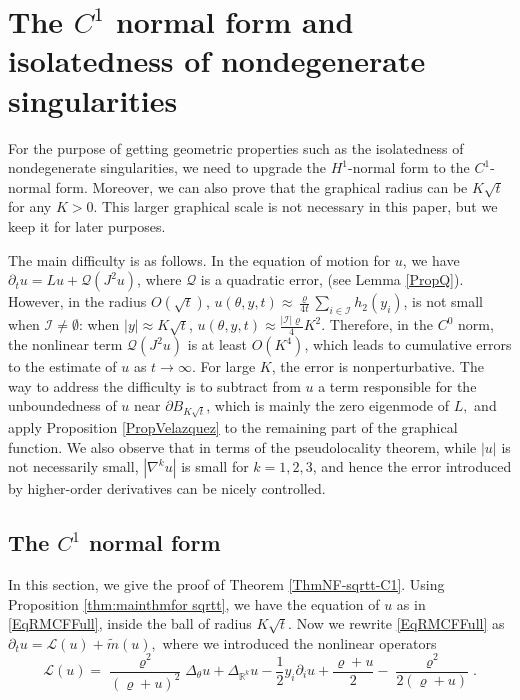\documentclass[11pt]{amsart}
\numberwithin{equation}{section}
\numberwithin{equation}{section}
\newcommand{\cQ}{\mathcal{Q}}
\newcommand{\cI}{\mathcal{I}}
\newcommand{\sL}{\mathscr{L}}
\newcommand{\R}{\mathbb{R}}
\newcommand{\pr}{\partial}
\begin{document}
	
	
	
	\section{The $C^1$ normal form and isolatedness of nondegenerate singularities}\label{SS:The global variational equation: scale up to}
	
	For the purpose of getting geometric properties such as the isolatedness of nondegenerate singularities, we need to upgrade the $H^1$-normal form to the $C^1$-normal form. Moreover, we can also prove that the graphical radius can be $K\sqrt{t}$ for any $K>0$. This larger graphical scale is not necessary in this paper, but we keep it for later purposes. 
	
	The main difficulty is as follows. In the equation of motion for $u$, we have $\pr_t u=Lu+\cQ(J^2u)$, where $\cQ$ is a quadratic error, (see Lemma \ref{PropQ}). However, in the radius $O(\sqrt{t})$, $u(\theta,y,t)\approx \frac{\varrho}{4t}\sum_{i\in\cI}h_2(y_i)$, is not small when $\cI\not=\emptyset$: when $|y|\approx K\sqrt t$, $u(\theta,y,t)\approx \frac{|\cI|\varrho}{4}K^2$. Therefore, in the $C^0$ norm, the nonlinear term $\cQ(J^2u)$ is at least $O(K^4)$, which leads to cumulative errors to the estimate of $u$ as $t\to\infty$. For large $K$, the error is nonperturbative. 
	The way to address the difficulty is to subtract from $u$ a term responsible for the unboundedness of $u$ near $\partial B_{K\sqrt{t}}$, which is mainly the zero eigenmode of $L,$ and apply Proposition \ref{PropVelazquez} to the remaining part of the graphical function. We also observe that in terms of the pseudolocality theorem, while $|u|$ is not necessarily small, $|\nabla^k u|$ is small for $k=1,2,3$, and hence the error introduced by higher-order derivatives can be nicely controlled.
	
	\subsection{The $C^1$ normal form}
	In this section, we give the proof of Theorem \ref{ThmNF-sqrtt-C1}.	Using Proposition \ref{thm:mainthmfor sqrtt}, we have the equation of $u$ as in \eqref{EqRMCFFull}, inside the ball of radius $K\sqrt{t}$. Now we rewrite \eqref{EqRMCFFull} as
	$\pr_t u
	=
	\mathscr L( u)
	+\tilde m(u),$
	where we introduced the nonlinear operators $$\sL (u)= \frac{\varrho^2}{(\varrho+u)^2}\Delta_\theta u
	+\Delta_{\R^k} u
	-\frac12y_i\pr_i u
	+\frac{\varrho+u}{2}
	-\frac{\varrho^2}{2(\varrho+u)}.$$
	
\end{document}
